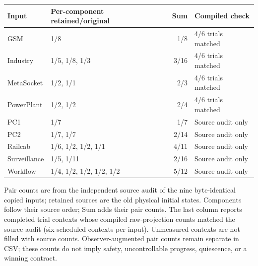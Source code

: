 \begin{tabular}{llrl}
\toprule
Input & Per-component retained/original & Sum & Compiled check \\
\midrule
GSM & 1/8 & 1/8 & 4/6 trials matched \\
Industry & 1/5, 1/8, 1/3 & 3/16 & 4/6 trials matched \\
MetaSocket & 1/2, 1/1 & 2/3 & 4/6 trials matched \\
PowerPlant & 1/2, 1/2 & 2/4 & 4/6 trials matched \\
PC1 & 1/7 & 1/7 & Source audit only \\
PC2 & 1/7, 1/7 & 2/14 & Source audit only \\
Railcab & 1/6, 1/2, 1/2, 1/1 & 4/11 & Source audit only \\
Surveillance & 1/5, 1/11 & 2/16 & Source audit only \\
Workflow & 1/4, 1/2, 1/2, 1/2, 1/2 & 5/12 & Source audit only \\
\bottomrule
\end{tabular}
{\par\smallskip\footnotesize Pair counts are from the independent source audit of the nine byte-identical copied inputs; retained sources are the old physical initial states. Components follow their source order; Sum adds their pair counts. The last column reports completed trial contexts whose compiled raw-projection counts matched the source audit (six scheduled contexts per input). Unmeasured contexts are not filled with source counts. Observer-augmented pair counts remain separate in CSV; these counts do not imply safety, uncontrollable progress, quiescence, or a winning contract.}
